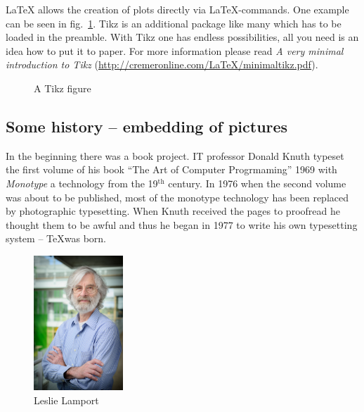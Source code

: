 \documentclass[11pt, a4paper]{article}
\newcommand{\ltx}{\LaTeX}
\begin{document}
\ltx{} allows the creation of plots directly via \ltx-commands. One example can be seen in fig.~\ref{fig:tikz}. Tikz is an additional package like many which has to be loaded in the
preamble. With Tikz one has endless possibilities, all you need is an idea how to put it to paper. For more information please read \textit{A very minimal introduction to Tikz} (\url{http://cremeronline.com/LaTeX/minimaltikz.pdf}).
%
\begin{figure}[t]
\centering
{}
\caption{A Tikz figure\label{fig:tikz}}
\end{figure}


\subsection{Some history -- embedding of pictures}
In the beginning there was a book project. IT professor Donald Knuth typeset the first volume of his book ``The Art of Computer Progrmaming'' 1969 with \textit{Monotype} a technology from the 19\(^{\text{th}}\) century. In 1976 when the second volume was about to be published, most of the monotype technology has been replaced by photographic typesetting. When Knuth received the pages to proofread he thought them to be awful and thus he began in 1977 to write his own typesetting system -- \TeX was born.

\begin{figure}[htb]
\centering
\includegraphics[width=0.3\textwidth]{Leslie_Lamportd}
\caption{Leslie Lamport\label{fig:LL}}
\end{figure}
\end{document}
